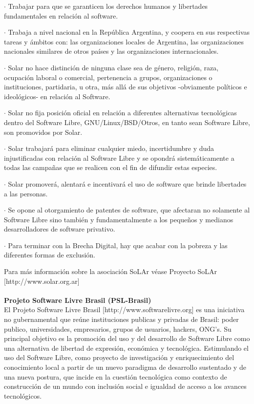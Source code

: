 \begin{description}
\item $\cdot$ Trabajar para que se garanticen los derechos humanos y libertades fundamentales en relación al software.
\item $\cdot$ Trabaja a nivel nacional en la República Argentina, y coopera en sus respectivas tareas y ámbitos con: las organizaciones locales de Argentina, las organizaciones nacionales similares de otros países y las organizaciones internacionales.
\item $\cdot$ Solar no hace distinción de ninguna clase sea de género, religión, raza, ocupación laboral o comercial, pertenencia a grupos, organizaciones o instituciones, partidaria, u otra, más allá de sus objetivos -obviamente políticos e ideológicos- en relación al Software.
\item $\cdot$ Solar no fija posición oficial en relación a diferentes alternativas tecnológicas dentro del Software Libre, GNU/Linux/BSD/Otros, en tanto sean Software Libre, son promovidos por Solar.
\item $\cdot$ Solar trabajará para eliminar cualquier miedo, incertidumbre y duda injustificadas con relación al Software Libre y se opondrá sistemáticamente a todas las campañas que se realicen con el fin de difundir estas especies.
\item $\cdot$ Solar promoverá, alentará e incentivará el uso de software que brinde libertades a las personas.
\item $\cdot$ Se opone al otorgamiento de patentes de software, que afectaran no solamente al Software Libre sino también y fundamentalmente a los pequeños y medianos desarrolladores de software privativo.
\item $\cdot$ Para terminar con la Brecha Digital, hay que acabar con la pobreza y las diferentes formas de exclusión.
\end{description}
Para más información sobre la asociación SoLAr véase Proyecto SoLAr [http://www.solar.org.ar]
\\
\\
{\bf Projeto Software Livre Brasil (PSL-Brasil)}
\\
El Projeto Software Livre Brasil [http://www.softwarelivre.org] es una iniciativa no gubernamental que reúne instituciones publicas y privadas de Brasil: poder publico, universidades, empresarios, grupos de usuarios, hackers, ONG's. Su principal objetivo es la promoción del uso y del desarrollo de Software Libre como una alternativa de libertad de expresión, económica y tecnológica. Estimulando el uso del Software Libre, como proyecto de investigación y enriquecimiento del conocimiento local a partir de un nuevo paradigma de desarrollo sustentado y de una nueva postura, que incide en la cuestión tecnológica como contexto de construcción de un mundo con inclusión social e igualdad de acceso a los avances tecnológicos.
